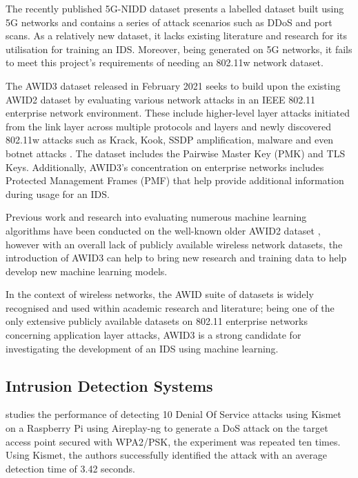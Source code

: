 

\smallskip
The recently published 5G-NIDD dataset \parencite{10.23729/e80ac9df-d9fb-47e7-8d0d-01384a415361} presents a labelled dataset built using 5G networks and contains a series of attack scenarios such as DDoS and port scans. As a relatively new dataset, it lacks existing literature and research for its utilisation for training an IDS. Moreover, being generated on 5G networks, it fails to meet this project's requirements of needing an 802.11w network dataset.
\medskip

The AWID3 dataset \parencite{9360747} released in February 2021 seeks to build upon the existing AWID2 dataset by evaluating various network attacks in an IEEE 802.11 enterprise network environment. These include higher-level layer attacks initiated from the link layer across multiple protocols and layers and newly discovered 802.11w attacks such as Krack, Kook, SSDP amplification, malware and even botnet attacks \parencite{kolias2015intrusion}. The dataset includes the Pairwise Master Key (PMK) and TLS Keys. Additionally, AWID3's concentration on enterprise networks includes Protected Management Frames (PMF) that help provide additional information during usage for an IDS. 

Previous work and research into evaluating numerous machine learning algorithms have been conducted on the well-known older AWID2 dataset \parencite{kolias2015intrusion}, however with an overall lack of publicly available wireless network datasets, the introduction of AWID3 can help to bring new research and training data to help develop new machine learning models.  

In the context of wireless networks, the AWID suite of datasets is widely recognised and used within academic research and literature; being one of the only extensive publicly available datasets on 802.11 enterprise networks concerning application layer attacks, AWID3 is a strong candidate for investigating the development of an IDS using machine learning. 

\subsection{Intrusion Detection Systems}

\textcite{10.4108/eai.27-11-2021.2315535} studies the performance of detecting 10 Denial Of Service attacks using Kismet on a Raspberry Pi using Aireplay-ng to generate a DoS attack on the target access point secured with WPA2/PSK, the experiment was repeated ten times. Using Kismet, the authors successfully identified the attack with an average detection time of 3.42 seconds.

